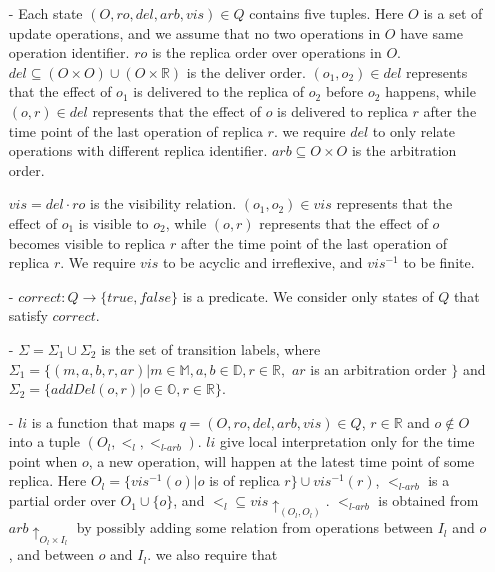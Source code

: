 \begin{itemize}
\setlength{\itemsep}{0.5pt}
\item[-] Each state $(O,ro,del,arb,vis) \in Q$ contains five tuples. Here $O$ is a set of update operations, and we assume that no two operations in $O$ have same operation identifier. $ro$ is the replica order over operations in $O$. $del \subseteq (O \times O) \cup (O \times \mathbb{R})$ is the deliver order. $(o_1,o_2) \in del$ represents that the effect of $o_1$ is delivered to the replica of $o_2$ before $o_2$ happens, while $(o,r) \in del$ represents that the effect of $o$ is delivered to replica $r$ after the time point of the last operation of replica $r$. we require $del$ to only relate operations with different replica identifier. $arb \subseteq O \times O$ is the arbitration order.

    $vis = del \cdot ro$ is the visibility relation. $(o_1,o_2) \in vis$ represents that the effect of $o_1$ is visible to $o_2$, while $(o,r)$ represents that the effect of $o$ becomes visible to replica $r$ after the time point of the last operation of replica $r$. We require $vis$ to be acyclic and irreflexive, and $vis^{-1}$ to be finite.

\item[-] $correct: Q \rightarrow \{ \textit{true},\textit{false} \}$ is a predicate. {\color {red} We consider only states of $Q$ that satisfy $correct$.}

\item[-] $\Sigma = \Sigma_1 \cup \Sigma_2$ is the set of transition labels, where $\Sigma_1 = \{ (m,a,b,r,ar) \vert m \in \mathbb{M}, a,b \in \mathbb{D}, r \in \mathbb{R},$ $ar$ is an arbitration order $\}$ and $\Sigma_2 = \{ addDel(o,r) \vert o \in \mathbb{O}, r \in \mathbb{R} \}$.

\item[-] $li$ is a function that maps $q = (O,ro,del,arb,vis) \in Q$, $r \in \mathbb{R}$ and $o \notin O$ into a tuple $( O_l ,<_l, <_{\textit{l-arb}} )$. $li$ give local interpretation only for the time point when $o$, a new operation, will happen at the latest time point of some replica. Here $O_l = \{ vis^{-1}(o) \vert o$ is of replica $r \} \cup vis^{-1}(r)$, $<_{\textit{l-arb}}$ is a partial order over $O_1 \cup \{ o \}$, and $<_l \subseteq vis \uparrow_{(O_l,O_l)}$. $<_{\textit{l-arb}}$ is obtained from $arb \uparrow_{O_l \times I_l}$ by possibly adding some relation from operations between $I_l$ and $o$, and  between $o$ and $I_l$. we also require that


\end{itemize}

